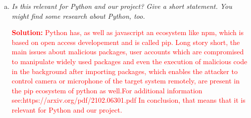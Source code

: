 \begin{enumerate}[(a)]
\begin{enumerate}[1.]
    \end{enumerate}
    \item \itshape{Is this relevant for Python and our project? Give a short statement. You might find some research about Python, too.}
    \begin{itemize}
        \textcolor{red}{\textbf{Solution:} Python has, as well as javascript an ecosystem like npm, which is based on open access developement and is called pip. Long story short, the main issues about malicious packages, user accounts which are compromised to manipulate widely used packages and even the execution of malicious code in the background after importing packages, which enables the attacker to control camera or microphone of the target system remotely, are present in the pip ecosystem of python as well.For additional information see:https://arxiv.org/pdf/2102.06301.pdf In conclusion, that means that it is relevant for Python and our project.}
    \end{itemize}
\end{enumerate}








